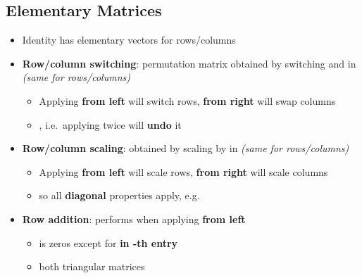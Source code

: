 \subsection*{Elementary Matrices}

\begin{itemize}

\item
  Identity
  has elementary vectors 
  for rows/columns
\item
  \textbf{Row/column switching}: permutation matrix 
  obtained by switching  and
   in  \emph{(same for
  rows/columns)}

  \begin{itemize}
  
  \item
    Applying  \textbf{from left} will switch rows,
    \textbf{from right} will swap columns
  \item
    , i.e.~applying twice
    will \textbf{undo} it
  \end{itemize}
\item
  \textbf{Row/column scaling}:  obtained by
  scaling  by \iMbox{\lambda} in
   \emph{(same for rows/columns)}

  \begin{itemize}
  
  \item
    Applying  \textbf{from left} will scale rows,
    \textbf{from right} will scale columns
  \item
    so all \textbf{diagonal} properties apply,
    e.g.~
  \end{itemize}
\item
  \textbf{Row addition}:
  performs  when
  applying \textbf{from left}

  \begin{itemize}
  
  \item
     is zeros except
    for \textbf{\iMbox{\lambda} in -th entry}
  \item
     both triangular
    matrices
  \end{itemize}
\end{itemize}

